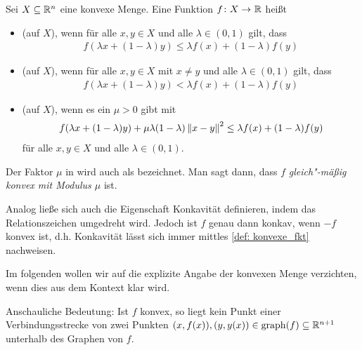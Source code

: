 \begin{definition} \label{def: konvexe_fkt}
	Sei $X \subseteq \mathbb{R}^n$ eine konvexe Menge. Eine Funktion $\abb{f}{X}{\R}$ heißt
	\begin{itemize}[leftmargin=*, nolistsep]
		\item {} (auf $X$), wenn für alle $x,y \in X$ und alle $\lambda \in (0,1)$ gilt, dass
		\begin{align} \label{eq: konvexe_fkt}
			f(\lambda x + (1-\lambda)y) \leq \lambda f(x) + (1-\lambda) f(y)
		\end{align}
		\item {} (auf $X$), wenn für alle $x,y \in X$ mit $x \neq y$ und alle $\lambda \in (0,1)$ gilt, dass
		\begin{align} \label{eq: strikt_konvex}
			f(\lambda x + (1-\lambda)y) < \lambda f(x) + (1-\lambda) f(y)
		\end{align}
		\item {} (auf $X$), wenn es ein $\mu > 0$ gibt mit 
		\begin{align} \label{eq: gleichmaessig_konvex}
			f(\lambda x + (1-\lambda)y) + \mu \lambda (1-\lambda) \left\lVert x-y \right\rVert^2 \leq \lambda f(x) + (1-\lambda) f(y)
		\end{align}
		für alle $x,y \in X$ und alle $\lambda \in (0,1)$.
	\end{itemize}
\end{definition}

\begin{bemerkung}
	Der Faktor $\mu$ in  wird auch als  bezeichnet. Man sagt dann, dass $f$ \textit{gleich"-mäßig konvex mit Modulus $\mu$} ist.
	
	Analog ließe sich auch die Eigenschaft Konkavität definieren, indem das Relationszeichen umgedreht wird. Jedoch ist $f$ genau dann konkav, wenn $-f$ konvex ist, d.h. Konkavität lässt sich immer mittles \cref{def: konvexe_fkt} nachweisen.
	
	Im folgenden wollen wir auf die explizite Angabe der konvexen Menge verzichten, wenn dies aus dem Kontext klar wird.
	
	Anschauliche Bedeutung:
	Ist $f$ konvex, so liegt kein Punkt einer Verbindungsstrecke von zwei Punkten $(x,f(x)) , (y,y(x)) \in \operatorname{graph}(f) \subseteq \mathbb{R}^{n+1}$ unterhalb des Graphen von $f$.
\end{bemerkung}


